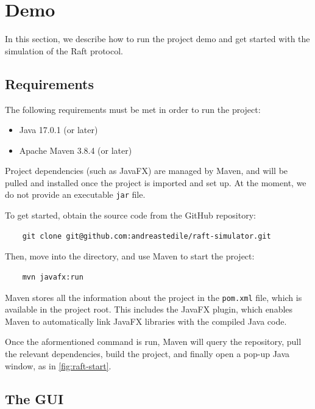 \section{Demo}
\label{demo}

In this section, we describe how to run the project demo and get started with the simulation of the Raft protocol.

\subsection{Requirements}

The following requirements must be met in order to run the project:

\begin{itemize}
    \item Java 17.0.1 (or later)
    \item Apache Maven 3.8.4 (or later)
\end{itemize}

Project dependencies (such as JavaFX) are managed by Maven, and will be pulled and installed once the project is imported and set up. At the moment, we do not provide an executable \verb=jar= file.

To get started, obtain the source code from the GitHub repository:

\begin{verbatim}
    git clone git@github.com:andreastedile/raft-simulator.git
\end{verbatim}

Then, move into the directory, and use Maven to start the project:

\begin{verbatim}
    mvn javafx:run
\end{verbatim}

Maven stores all the information about the project in the \verb=pom.xml= file, which is available in the project root. This includes the JavaFX plugin, which enables Maven to automatically link JavaFX libraries with the compiled Java code.

Once the aformentioned command is run, Maven will query the repository, pull the relevant dependencies, build the project, and finally open a pop-up Java window, as in \autoref{fig:raft-start}.

\subsection{The GUI}


